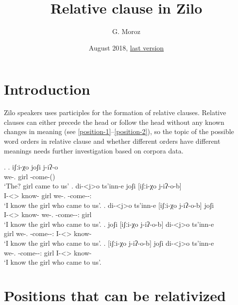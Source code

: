 
\title{\Large Relative clause in Zilo}
\author{G. Moroz}
\date{August 2018, \href{https://github.com/agricolamz/2018_Andi_relative_clause/raw/master/main.pdf}{last version}}
 
\maketitle

\section{Introduction}
Zilo speakers uses participles for the formation of relative clauses. Relative clauses can either precede the head or follow the head without any known changes in meaning (see \ref{position-1}--\ref{position-2}), so the topic of the possible word orders in relative clause and whether different orders have different meanings needs further investigation based on corpora data.

\ex. 
	\ag. iʃːi-χo joʃi j-iʔ-o\\
		 {we-\Add.\Lat} {girl} {\F-come-\Pst(\Aor)}\\
		 \glt    `The? girl came to us'
	\bg. di-<j>o ts'inn-e joʃi [iʃːi-χo j-iʔ-o-b]\\
		 {I-<\F>\Aff} {know-\Hab} {girl} {we-\Add.\Lat} {\F-come-\Pst-\Ptcp:\Pst}\\
		 \glt    `I know the girl who came to us'. \label{position-1}
	\bg. di-<j>o ts'inn-e [iʃːi-χo j-iʔ-o-b] joʃi \\
		 {I-<\F>\Aff} {know-\Hab} {we-\Add.\Lat} {\F-come-\Pst-\Ptcp:\Pst} {girl}\\
		 \glt    `I know the girl who came to us'.
	\bg. joʃi  [iʃːi-χo j-iʔ-o-b] di-<j>o ts'inn-e \\
		  {girl}  {we-\Add.\Lat} {\F-come-\Pst-\Ptcp:\Pst} {I-<\F>\Aff} {know-\Hab}\\
		 \glt    `I know the girl who came to us'.
	\bg. [iʃːi-χo j-iʔ-o-b] joʃi di-<j>o ts'inn-e \\
		  {we-\Add.\Lat} {\F-come-\Pst-\Ptcp:\Pst} {girl} {I-<\F>\Aff} {know-\Hab}\\
		 \glt    `I know the girl who came to us'. \label{position-2}

\section{Positions that can be relativized}

